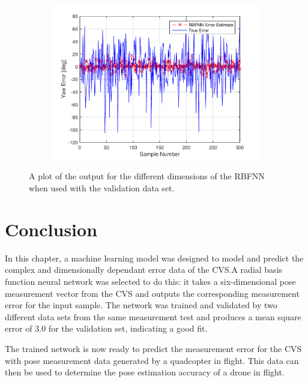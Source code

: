 \begin{figure}
\begin{subfigure}{0.3\textwidth}
    \caption{}
  \end{subfigure}
~
  \begin{subfigure}{0.3\textwidth}
    \includegraphics[width=\textwidth]{figures/chapter4/yaw_valid}
    \caption{}
  \end{subfigure}
  \caption[The output of the RBFNN with the validation set input.]{A plot of the output for the different dimensions of the RBFNN when used with the validation data set.}
  \label{fig:chap4-rbf-valid}
\end{figure}

\section{Conclusion}

In this chapter, a machine learning model was designed to model and predict the complex and dimensionally dependant error data of the CVS.\@ A radial basis function neural network was selected to do this: it takes a six-dimensional pose measurement vector from the CVS and outputs the corresponding measurement error for the input sample. The network was trained and validated by two different data sets from the same measurement test and produces a mean square error of 3.0 for the validation set, indicating a good fit. 

The trained network is now ready to predict the measurement error for the CVS with pose measurement data generated by a quadcopter in flight. This data can then be used to determine the pose estimation accuracy of a drone in flight. 

